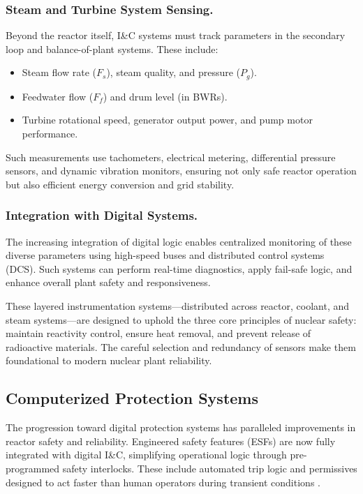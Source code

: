 \documentclass[12pt]{article}
\begin{document}
\subsubsection{Steam and Turbine System Sensing.}
Beyond the reactor itself, I\&C systems must track parameters in the secondary loop and balance-of-plant systems. These include:
\begin{itemize}
  \item Steam flow rate ($F_s$), steam quality, and pressure ($P_g$).
  \item Feedwater flow ($F_f$) and drum level (in BWRs).
  \item Turbine rotational speed, generator output power, and pump motor performance.
\end{itemize}
Such measurements use tachometers, electrical metering, differential pressure sensors, and dynamic vibration monitors, ensuring not only safe reactor operation but also efficient energy conversion and grid stability.

\subsubsection{Integration with Digital Systems.}
The increasing integration of digital logic enables centralized monitoring of these diverse parameters using high-speed buses and distributed control systems (DCS). Such systems can perform real-time diagnostics, apply fail-safe logic, and enhance overall plant safety and responsiveness.

These layered instrumentation systems—distributed across reactor, coolant, and steam systems—are designed to uphold the three core principles of nuclear safety: maintain reactivity control, ensure heat removal, and prevent release of radioactive materials. The careful selection and redundancy of sensors make them foundational to modern nuclear plant reliability.

\subsection{Computerized Protection Systems}
\label{sec:protection}

The progression toward digital protection systems has paralleled improvements in reactor safety and reliability. Engineered safety features (ESFs) are now fully integrated with digital I\&C, simplifying operational logic through pre-programmed safety interlocks. These include automated trip logic and permissives designed to act faster than human operators during transient conditions \cite{moderninstruments}.
\end{document}
